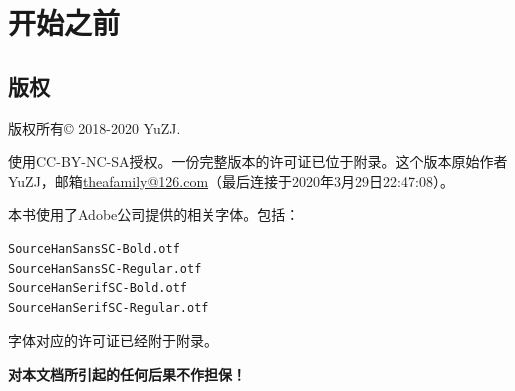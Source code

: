 \part{开始之前}
\chapter*{版权}
版权所有\copyright{} 2018-2020 YuZJ. \par
使用CC-BY-NC-SA授权。一份完整版本的许可证已位于附录。这个版本原始作者YuZJ，邮箱\url{theafamily@126.com}（最后连接于2020年3月29日22:47:08）。\par
本书使用了Adobe公司提供的相关字体。包括：
\begin{verbatim}
SourceHanSansSC-Bold.otf
SourceHanSansSC-Regular.otf
SourceHanSerifSC-Bold.otf
SourceHanSerifSC-Regular.otf
\end{verbatim}
字体对应的许可证已经附于附录。
\begin{center}
{\large \bf\color{red}对本文档所引起的任何后果不作担保！}
\end{center}
